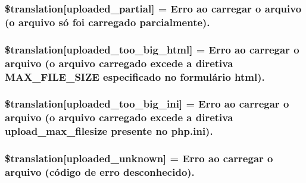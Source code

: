 \subsubsection[{\$translation}]{\setlength{\rightskip}{0pt plus 5cm}\$translation\mbox{[}\textquotesingle{}uploaded\+\_\+partial\textquotesingle{}\mbox{]} = \textquotesingle{}Erro ao carregar o arquivo (o arquivo só foi carregado parcialmente).\textquotesingle{}}\label{class_8upload_8pt___b_r_8php_a967c17da21b0a2d3bd65cca3a9ca0ea8}
\hypertarget{class_8upload_8pt___b_r_8php_a623d5b8b92169f57d7e43458aa911cbb}{}
\subsubsection[{\$translation}]{\setlength{\rightskip}{0pt plus 5cm}\$translation\mbox{[}\textquotesingle{}uploaded\+\_\+too\+\_\+big\+\_\+html\textquotesingle{}\mbox{]} = \textquotesingle{}Erro ao carregar o arquivo (o arquivo carregado excede a diretiva M\+A\+X\+\_\+\+F\+I\+L\+E\+\_\+\+S\+I\+Z\+E especificado no formulário html).\textquotesingle{}}\label{class_8upload_8pt___b_r_8php_a623d5b8b92169f57d7e43458aa911cbb}
\hypertarget{class_8upload_8pt___b_r_8php_a6a08dcd0d3651fdd098568f6b2f0a42c}{}
\subsubsection[{\$translation}]{\setlength{\rightskip}{0pt plus 5cm}\$translation\mbox{[}\textquotesingle{}uploaded\+\_\+too\+\_\+big\+\_\+ini\textquotesingle{}\mbox{]} = \textquotesingle{}Erro ao carregar o arquivo (o arquivo carregado excede a diretiva upload\+\_\+max\+\_\+filesize presente no php.\+ini).\textquotesingle{}}\label{class_8upload_8pt___b_r_8php_a6a08dcd0d3651fdd098568f6b2f0a42c}
\hypertarget{class_8upload_8pt___b_r_8php_a4a9168e922b827e6a28b5db1c00774ca}{}
\subsubsection[{\$translation}]{\setlength{\rightskip}{0pt plus 5cm}\$translation\mbox{[}\textquotesingle{}uploaded\+\_\+unknown\textquotesingle{}\mbox{]} = \textquotesingle{}Erro ao carregar o arquivo (código de erro desconhecido).\textquotesingle{}}\label{class_8upload_8pt___b_r_8php_a4a9168e922b827e6a28b5db1c00774ca}
\hypertarget{class_8upload_8pt___b_r_8php_aabca0b65dadbc6184415c16375f284ca}{}
